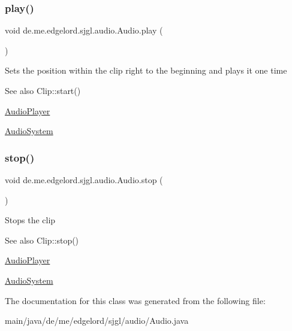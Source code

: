 \subsubsection{\texorpdfstring{play()}{play()}}
{\footnotesize\ttfamily void de.\+me.\+edgelord.\+sjgl.\+audio.\+Audio.\+play (\begin{DoxyParamCaption}{ }\end{DoxyParamCaption})}

Sets the position within the clip right to the beginning and plays it one time

\begin{DoxySeeAlso}{See also}
Clip\+::start() 

\mbox{\hyperlink{classde_1_1me_1_1edgelord_1_1sjgl_1_1audio_1_1_audio_player}{Audio\+Player}} 

\mbox{\hyperlink{classde_1_1me_1_1edgelord_1_1sjgl_1_1audio_1_1_audio_system}{Audio\+System}} 
\end{DoxySeeAlso}
\mbox{\label{classde_1_1me_1_1edgelord_1_1sjgl_1_1audio_1_1_audio_a2e9d9c2e43c4bab399c7f360c8f90ce2}} 
\subsubsection{\texorpdfstring{stop()}{stop()}}
{\footnotesize\ttfamily void de.\+me.\+edgelord.\+sjgl.\+audio.\+Audio.\+stop (\begin{DoxyParamCaption}{ }\end{DoxyParamCaption})}

Stops the clip

\begin{DoxySeeAlso}{See also}
Clip\+::stop() 

\mbox{\hyperlink{classde_1_1me_1_1edgelord_1_1sjgl_1_1audio_1_1_audio_player}{Audio\+Player}} 

\mbox{\hyperlink{classde_1_1me_1_1edgelord_1_1sjgl_1_1audio_1_1_audio_system}{Audio\+System}} 
\end{DoxySeeAlso}


The documentation for this class was generated from the following file\+:\begin{DoxyCompactItemize}
\item 
main/java/de/me/edgelord/sjgl/audio/Audio.\+java\end{DoxyCompactItemize}
